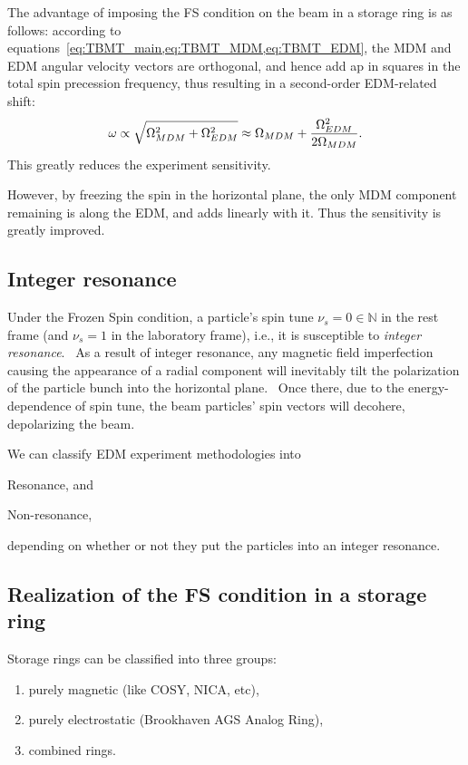 \documentclass{article}
\begin{document}
The advantage of imposing the FS condition on the beam in a storage ring is as follows: according to equations~\cref{eq:TBMT_main,eq:TBMT_MDM,eq:TBMT_EDM}, the MDM and EDM angular velocity vectors are orthogonal, and hence add ap in squares in the total spin precession frequency, thus resulting in a second-order EDM-related shift:~\citep[p.~5]{Mane:SpinWheel}
\[
\omega \propto \sqrt{\Omega_{MDM}^2 + \Omega_{EDM}^2} \approx \Omega_{MDM} + \frac{\Omega_{EDM}^2}{2\Omega_{MDM}}.
\]
This greatly reduces the experiment sensitivity.

However, by freezing the spin in the horizontal plane, the only MDM component remaining is along the EDM, and adds linearly with it. Thus the sensitivity is greatly improved.

\subsection{Integer resonance}
Under the Frozen Spin condition, a particle's spin tune $\nu_s = 0 \in \mathbb{N}$ in the rest frame (and $\nu_s = 1$ in the laboratory frame), i.e., it is susceptible to \emph{integer resonance}.~\cite{COSY:ImperfectionResonance} As a result of integer resonance, any magnetic field imperfection causing the appearance of a radial component will inevitably tilt the polarization of the particle bunch into the horizontal plane.~\citep[p.~8]{COSY:ImperfectionResonance} Once there, due to the energy-dependence of spin tune, the beam particles' spin vectors will decohere, depolarizing the beam.

We can classify EDM experiment methodologies into
\begin{inparaenum}[1)]
\item Resonance, and
\item Non-resonance,
\end{inparaenum}
depending on whether or not they put the particles into an integer resonance.

\subsection{Realization of the FS condition in a storage ring}
Storage rings can be classified into three groups:
\begin{enumerate}
\item purely magnetic (like COSY, NICA, etc),
\item purely electrostatic (Brookhaven AGS Analog Ring),
\item combined rings.
\end{enumerate}
\end{document}
